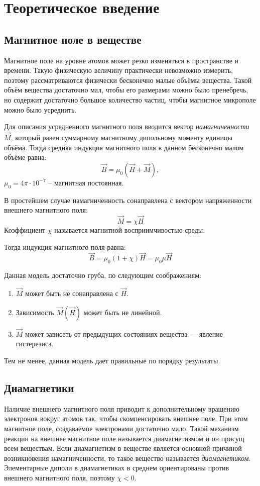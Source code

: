 
\section*{Теоретическое введение}
\subsection*{Магнитное поле в веществе}

Магнитное поле на уровне атомов может резко изменяться в пространстве и времени. Такую физическую величину практически невозможно измерить, поэтому рассматриваются физически бесконечно малые объёмы вещества. Такой объём вещества достаточно мал, чтобы его размерами можно было пренебречь, но содержит достаточно большое количество частиц, чтобы магнитное микрополе можно было усреднить.

Для описания усредненного магнитного поля вводится вектор \textit{намагниченности} $\vec{M}$, который равен суммарному магнитному дипольному моменту единицы объёма. Тогда средняя индукция магнитного поля в данном бесконечно малом объёме равна:
$$
\vec{B} = \mu_0 (\vec{H} + \vec{M}),
$$
$\mu_0 = 4 \pi \cdot 10^{-7}$ -- магнитная постоянная.

В простейшем случае намагниченность сонаправлена с вектором напряженности внешнего магнитного поля:
$$
\vec{M} = \chi \vec{H}
$$
Коэффициент $\chi$ называется магнитной восприимчивостью среды.

Тогда индукция магнитного поля равна:
$$
\vec{B} =  \mu_0 (1 + \chi) \vec{H} = \mu_0 \mu \vec{H}
$$

Данная модель достаточно груба, по следующим соображениям:
\begin{enumerate}
	\item $\vec{M}$ может быть не сонаправлена с $\vec{H}$.
	
	\item Зависимость $\vec{M}(\vec{H})$ может быть не линейной.
	
	\item $\vec{M}$ может зависеть от предыдущих состояниях вещества --- явление гистерезиса.
\end{enumerate}
Тем не менее, данная модель дает правильные по порядку результаты.

\subsection*{Диамагнетики}

Наличие внешнего магнитного поля приводит к дополнительному вращению электронов вокруг атомов так, чтобы скомпенсировать внешнее поле. При этом магнитное поле, создаваемое электронами достаточно мало. Такой механизм реакции на внешнее магнитное поле называется диамагнетизмом и он присущ всем веществам. Если диамагнетизм в веществе является основной причиной возникновения намагниченности, то такое вещество называется \textit{диамагнетиком}. Элементарные диполи в диамагнетиках в среднем ориентированы против внешнего магнитного поля, поэтому $\chi < 0$.

